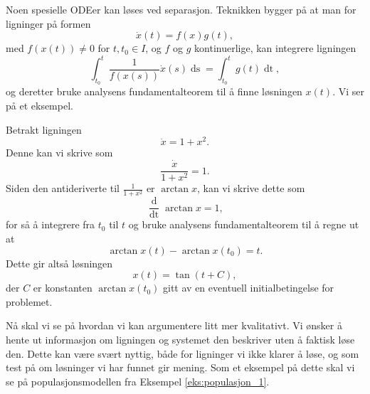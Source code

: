 \documentclass{article}
\theoremstyle{plain}
\theoremstyle{definition}
\theoremstyle{remark}
\newenvironment{ex}
{\pushQED{\qed}\renewcommand{\qedsymbol}{$\triangle$}\exx}
{\popQED\endexx}
\newcommand{\diff}[1]{\mathop{d#1}}
\newcommand{\fcn}{x}
\begin{document}
Noen spesielle ODEer kan løses ved separasjon. Teknikken bygger på at man for ligninger på formen
\begin{equation*}
    \dot{\fcn}(t) = f(\fcn) g(t),
\end{equation*}
med $f(\fcn(t)) \neq 0$ for $t, t_0 \in I$, og $f$ og $g$ kontinuerlige, kan integrere ligningen
\begin{equation*}
    \int_{t_0}^t \frac{1}{f(\fcn(s))} \dot{\fcn}(s) \diff{s} = \int_{t_0}^t g(t) \diff{t},
\end{equation*}
og deretter bruke analysens fundamentalteorem til å finne løsningen $\fcn(t)$. Vi ser på et eksempel.

\begin{ex}
    Betrakt ligningen
    \begin{equation*}
        \dot{\fcn} = 1 + \fcn^2.
    \end{equation*}
    Denne kan vi skrive som
    \begin{equation*}
        \frac{\dot{\fcn}}{1 + \fcn^2} = 1.
    \end{equation*}
    Siden den antideriverte til $\frac{1}{1+\fcn^2}$ er $\arctan \fcn$, kan vi skrive dette som
    \begin{equation*}
        \frac{\diff{}}{\diff{t}} \arctan \fcn = 1,
    \end{equation*}
    for så å integrere fra $t_0$ til $t$ og bruke analysens fundamentalteorem til å regne ut at
    \begin{equation*}
        \arctan \fcn(t) - \arctan \fcn(t_0) = t.
    \end{equation*}
    Dette gir altså løsningen
    \begin{equation*}
        \fcn(t) = \tan(t + C),
    \end{equation*}
    der $C$ er konstanten $\arctan \fcn(t_0)$ gitt av en eventuell initialbetingelse for problemet.
\end{ex}

Nå skal vi se på hvordan vi kan argumentere litt mer kvalitativt. Vi ønsker å hente ut informasjon om ligningen og systemet den beskriver uten å faktisk løse den. Dette kan være svært nyttig, både for ligninger vi ikke klarer å løse, og som test på om løsninger vi har funnet gir mening. Som et eksempel på dette skal vi se på populasjonsmodellen fra Eksempel \ref{eks:populasjon_1}.
\end{document}
